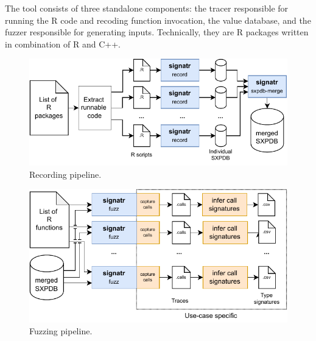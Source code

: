 \documentclass[sigplan,anonymous,review]{acmart}
\begin{document}
The tool consists of three standalone components:  the tracer responsible for running the R code and recoding function invocation,  the value database, and  the fuzzer responsible for generating inputs.
Technically, they are R packages written in combination of R and C++.

\begin{figure}
    \centering
    \includegraphics[width=\columnwidth]{code-and-figures/sxdb-pipeline.pdf}
    \caption{
    Recording pipeline.
    }\label{fig:sxpdb-pipeline}
\end{figure}

\begin{figure}
    \centering
    \includegraphics[width=\columnwidth]{code-and-figures/fuzz-pipeline.pdf}
    \caption{
    Fuzzing pipeline.
    }\label{fig:fuzz-pipeline}
\end{figure}
\end{document}

